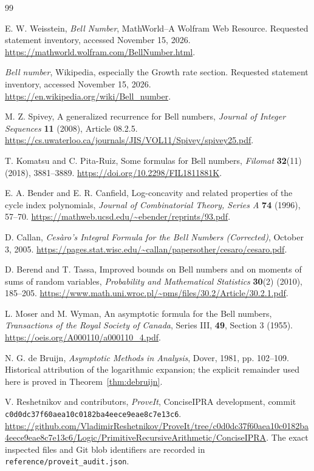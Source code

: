 \begin{thebibliography}{99}

E. W. Weisstein, \emph{Bell Number}, MathWorld--A Wolfram Web Resource.
Requested statement inventory, accessed November 15, 2026.
\url{https://mathworld.wolfram.com/BellNumber.html}.

\emph{Bell number}, Wikipedia, especially the Growth rate section.
Requested statement inventory, accessed November 15, 2026.
\url{https://en.wikipedia.org/wiki/Bell_number}.

M. Z. Spivey, A generalized recurrence for Bell numbers,
\emph{Journal of Integer Sequences} \textbf{11} (2008), Article 08.2.5.
\url{https://cs.uwaterloo.ca/journals/JIS/VOL11/Spivey/spivey25.pdf}.

T. Komatsu and C. Pita-Ruiz, Some formulas for Bell numbers,
\emph{Filomat} \textbf{32}(11) (2018), 3881--3889.
\url{https://doi.org/10.2298/FIL1811881K}.

E. A. Bender and E. R. Canfield, Log-concavity and related properties of the
cycle index polynomials, \emph{Journal of Combinatorial Theory, Series A}
\textbf{74} (1996), 57--70.
\url{https://mathweb.ucsd.edu/~ebender/reprints/93.pdf}.

D. Callan, \emph{Ces\`aro's Integral Formula for the Bell Numbers (Corrected)},
October 3, 2005.
\url{https://pages.stat.wisc.edu/~callan/papersother/cesaro/cesaro.pdf}.

D. Berend and T. Tassa, Improved bounds on Bell numbers and on moments of
sums of random variables, \emph{Probability and Mathematical Statistics}
\textbf{30}(2) (2010), 185--205.
\url{https://www.math.uni.wroc.pl/~pms/files/30.2/Article/30.2.1.pdf}.

L. Moser and M. Wyman, An asymptotic formula for the Bell numbers,
\emph{Transactions of the Royal Society of Canada}, Series III,
\textbf{49}, Section 3 (1955).
\url{https://oeis.org/A000110/a000110_4.pdf}.

N. G. de Bruijn, \emph{Asymptotic Methods in Analysis}, Dover, 1981,
pp. 102--109. Historical attribution of the logarithmic expansion; the
explicit remainder used here is proved in Theorem~\ref{thm:debruijn}.

V. Reshetnikov and contributors, \emph{ProveIt}, ConciseIPRA development,
commit \texttt{c0d0dc37f60aea10c0182ba4eece9eae8c7e13c6}.
\url{https://github.com/VladimirReshetnikov/ProveIt/tree/c0d0dc37f60aea10c0182ba4eece9eae8c7e13c6/Logic/PrimitiveRecursiveArithmetic/ConciseIPRA}.
The exact inspected files and Git blob identifiers are recorded in
\texttt{reference/proveit\_audit.json}.

\end{thebibliography}
